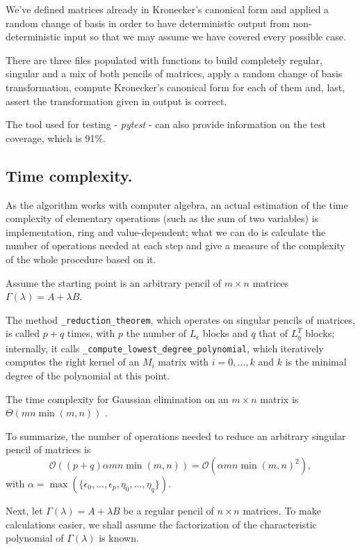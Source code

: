 We've defined matrices already in Kronecker's canonical form and applied a random change of basis in order to have
deterministic output from non-deterministic input so that we may assume we have covered every possible case.

There are three files populated with functions to build completely regular, singular and a mix of both
pencils of matrices, apply a random change of basis transformation, compute Kronecker's canonical form for each
of them and, last, assert the transformation given in output is correct.

The tool used for testing - \textit{pytest} - can also provide information on
the test coverage, which is 91\%.


\subsection*{Time complexity.}
As the algorithm works with computer algebra, an actual estimation of the time complexity of elementary operations
(such as the sum of two variables) is implementation, ring and value-dependent; what we can do is calculate
the number of operations needed at each step and give a measure of the complexity of the whole procedure based on it.

Assume the starting point is an arbitrary pencil of \(m \times n\) matrices \(\Gamma(\lambda) = A+\lambda B\).

The method \texttt{_reduction_theorem}, which operates on singular pencils of matrices,
is called \(p + q\) times, with \(p\) the number of \(L_\epsilon\) blocks and \(q\)
that of \(L^T_\eta\) blocks; internally, it calls \texttt{_compute_lowest_degree_polynomial}, which
iteratively computes the right kernel of an \(M_i\) matrix with \(i = 0, ..., k\) and \(k\) is the minimal degree
of the polynomial at this point.

\begin{remark}
    The time complexity for Gaussian elimination on an \(m \times n\) matrix is
    \(\Theta(mn \min(m, n))\) \cite{boyd_vandenberghe_2018}.
\end{remark}

To summarize, the number of operations needed to reduce an arbitrary singular pencil of matrices is
\[
    \mathcal{O}((p + q)\alpha mn \min(m, n)) = \mathcal{O}(\alpha mn \min(m, n)^2),
\]
with \(\alpha = \max(\{\epsilon_0, ..., \epsilon_p, \eta_0, ..., \eta_q\})\).

Next, let \(\Gamma(\lambda) = A + \lambda B\) be a regular pencil of \(n \times n\) matrices. To make calculations
easier, we shall assume the factorization of the characteristic polynomial of \(\Gamma(\lambda)\) is known.

